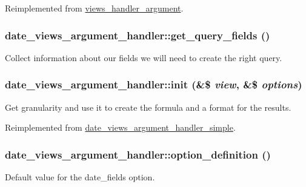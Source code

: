 Reimplemented from \hyperlink{classviews__handler__argument_abf38ef334b6e18e0aa43e5a829e3ce33}{views\_\-handler\_\-argument}.\hypertarget{classdate__views__argument__handler_a802f732806264b5d49ab336b58605c30}{
\subsubsection[{get\_\-query\_\-fields}]{\setlength{\rightskip}{0pt plus 5cm}date\_\-views\_\-argument\_\-handler::get\_\-query\_\-fields ()}}
\label{classdate__views__argument__handler_a802f732806264b5d49ab336b58605c30}
Collect information about our fields we will need to create the right query. \hypertarget{classdate__views__argument__handler_a8dd865de550c6c5d34ab8aea1d3ba204}{
\subsubsection[{init}]{\setlength{\rightskip}{0pt plus 5cm}date\_\-views\_\-argument\_\-handler::init (\&\$ {\em view}, \/  \&\$ {\em options})}}
\label{classdate__views__argument__handler_a8dd865de550c6c5d34ab8aea1d3ba204}
Get granularity and use it to create the formula and a format for the results. 

Reimplemented from \hyperlink{classdate__views__argument__handler__simple_afa0fa54cf00568c919af125b94c01ede}{date\_\-views\_\-argument\_\-handler\_\-simple}.\hypertarget{classdate__views__argument__handler_adb343ee7cff6d4db4744cd7af723d03f}{
\subsubsection[{option\_\-definition}]{\setlength{\rightskip}{0pt plus 5cm}date\_\-views\_\-argument\_\-handler::option\_\-definition ()}}
\label{classdate__views__argument__handler_adb343ee7cff6d4db4744cd7af723d03f}
Default value for the date\_\-fields option. 

